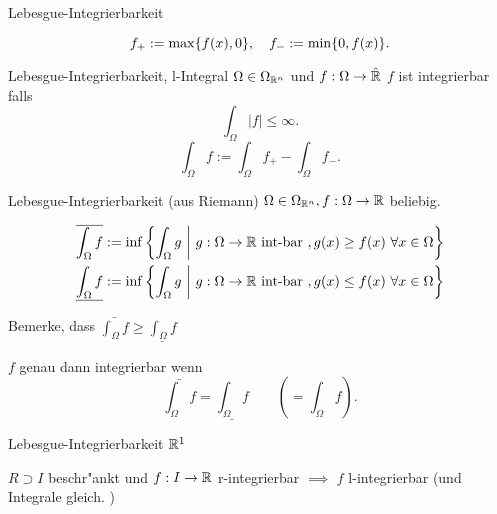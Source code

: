 \documentclass[class=article, crop=false]{standalone}
\begin{document}
\begin{zettel}{Lebesgue-Integrierbarkeit}

\begin{definition}
	\[
		f_+:= \max \set{f(x), 0}, \quad  f_-:= \min \set{0, f(x)}
	.\]
\end{definition}

\begin{flashcard}[cvdhrfg9]{Lebesgue-Integrierbarkeit, l-Integral}
	$\Omega \in  \Omega_{\mathbb{R}^n}$  und $f: \Omega \to  \hat{\mathbb{R}  }$  $f$ ist integrierbar falls
	\[
		\int_{\Omega} |f | \leq \infty
	.\]
	\[
		\int_{\Omega} f := \int_{\Omega} f_+ - \int_{\Omega} f_-
	.\]
\end{flashcard}

\begin{flashcard}[ziotrt7v]{Lebesgue-Integrierbarkeit (aus Riemann)}
	$\Omega \in  \Omega_{\mathbb{R}^n}, f:\Omega \to  \mathbb{R} $ beliebig.

	\begin{align*}
		\bar{\int_{\Omega}f}       & := \inf \set{\int_{\Omega} g}{g:\Omega \to  \R \tx{int-bar}, g(x)\geq  f(x)\forall x \in  \Omega } \\
		\underline{\int_{\Omega}f} & := \inf \set{\int_{\Omega} g}{g:\Omega \to  \R \tx{int-bar}, g(x)\leq  f(x)\forall x \in  \Omega } \\
	\end{align*}

	Bemerke, dass $\bar{\int_{\Omega} f} \geq \underline{\int_{\Omega}f}$

	\begin{lemma}
		$f$ genau dann integrierbar wenn
		\[
			\bar{\int_{\Omega}f} = \underline{\int_{\Omega}f} \qquad \left(= \int_{\Omega} f \right)
		.\]
	\end{lemma}
\end{flashcard}

\begin{lemma}
\end{lemma}

\begin{flashcard}[cqtcrghu]{Lebesgue-Integrierbarkeit $\mathbb{R} ^1$ }
	\begin{theorem}
		$R \supset I$ beschr"ankt und $f: I \to  \mathbb{R} $ r-integrierbar $\implies$ $f$ l-integrierbar (und Integrale gleich.  )
	\end{theorem}
\end{flashcard}

\end{zettel}
\end{document}
